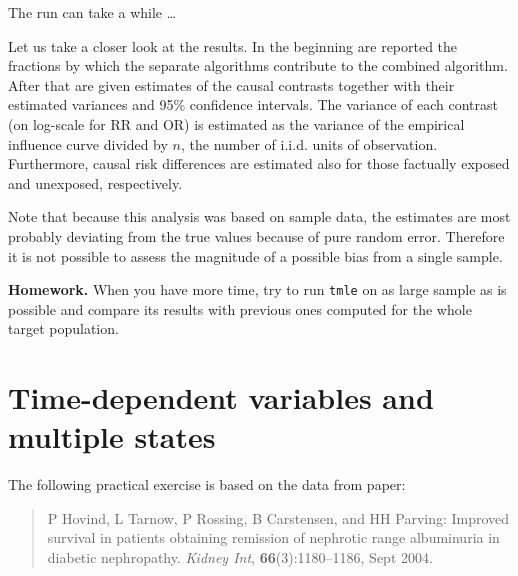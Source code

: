 \documentclass[
]{book}
\newenvironment{Shaded}{\begin{snugshade}}{\end{snugshade}}
\newcommand{\AttributeTok}[1]{\textcolor[rgb]{0.13,0.29,0.53}{#1}}
\newcommand{\FunctionTok}[1]{\textcolor[rgb]{0.13,0.29,0.53}{\textbf{#1}}}
\newcommand{\NormalTok}[1]{#1}
\newcommand{\OtherTok}[1]{\textcolor[rgb]{0.56,0.35,0.01}{#1}}
\newcommand{\SpecialCharTok}[1]{\textcolor[rgb]{0.81,0.36,0.00}{\textbf{#1}}}
\newcommand{\StringTok}[1]{\textcolor[rgb]{0.31,0.60,0.02}{#1}}
\begin{document}
The run can take a while \ldots{}

\begin{Shaded}
\end{Shaded}

Let us take a closer look at the results. In the beginning are reported
the fractions by which the separate algorithms contribute to the
combined algorithm. After that are given estimates
of the causal contrasts
together with their estimated variances and 95\% confidence intervals.
The variance of each contrast (on log-scale for RR and OR)
is estimated as the variance of the empirical influence curve
divided by \(n\), the number of i.i.d. units of observation.
Furthermore, causal risk differences are estimated
also for those factually exposed and unexposed, respectively.

Note that because this analysis was based on sample data, the
estimates are most probably deviating from the true values because
of pure random error.
Therefore it is not possible to assess the magnitude
of a possible bias from a single sample.

\textbf{Homework.}
When you have more time, try to run \texttt{tmle}
on as large sample as is possible and compare
its results with previous ones computed for the whole target population.

\chapter{Time-dependent variables and multiple states}\label{time-dependent-variables-and-multiple-states}

The following practical exercise is based on the data from paper:

\begin{quote}
P Hovind, L Tarnow, P Rossing, B Carstensen, and HH Parving:
Improved survival in patients obtaining remission of nephrotic range
albuminuria in diabetic nephropathy.
\emph{Kidney Int}, \textbf{66}(3):1180--1186, Sept 2004.
\end{quote}
\end{document}
